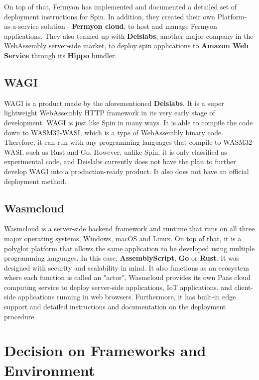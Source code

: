 On top of that, Fermyon has implemented and documented a detailed set of deployment instructions for Spin. In addition, they created their own Platform-as-a-service solution - \textbf{Fermyon cloud}, to host and manage Fermyon applications. They also teamed up with \textbf{Deislabs}, another major company in the WebAssembly server-side market, to deploy spin applications to \textbf{Amazon Web Service} through its \textbf{Hippo} bundler.

\bigskip
\subsection{WAGI}

WAGI is a product made by the aforementioned \textbf{Deislabs}. It is a super lightweight WebAssembly HTTP framework in its very early stage of development. WAGI is just like Spin in many ways. It is able to compile the code down to WASM32-WASI, which is a type of WebAssembly binary code. Therefore, it can run with any programming languages that compile to WASM32-WASI, such as Rust and Go. However, unlike Spin, it is only classified as experimental code, and Deislabs currently does not have the plan to further develop WAGI into a production-ready product. It also does not have an official deployment method.

\bigskip
\subsection{Wasmcloud}

Wasmcloud is a server-side backend framework and runtime that runs on all three major operating systems, Windows, macOS and Linux. On top of that, it is a polyglot platform that allows the same application to be developed using multiple programming languages. In this case, \textbf{AssemblyScript}, \textbf{Go} or \textbf{Rust}. It was designed with security and scalability in mind. It also functions as an ecosystem where each function is called an "actor", Wasmcloud provides its own Paas cloud computing service to deploy server-side applications, IoT applications, and client-side applications running in web browsers. Furthermore, it has built-in edge support and detailed instructions and documentation on the deployment procedure.

\bigskip
\section{Decision on Frameworks and Environment}

